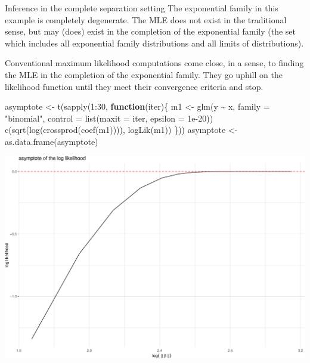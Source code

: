 \documentclass[
  ignorenonframetext,
]{beamer}
\newenvironment{Shaded}{\begin{snugshade}}{\end{snugshade}}
\newcommand{\AttributeTok}[1]{\textcolor[rgb]{0.77,0.63,0.00}{#1}}
\newcommand{\ControlFlowTok}[1]{\textcolor[rgb]{0.13,0.29,0.53}{\textbf{#1}}}
\newcommand{\DecValTok}[1]{\textcolor[rgb]{0.00,0.00,0.81}{#1}}
\newcommand{\FloatTok}[1]{\textcolor[rgb]{0.00,0.00,0.81}{#1}}
\newcommand{\FunctionTok}[1]{\textcolor[rgb]{0.00,0.00,0.00}{#1}}
\newcommand{\NormalTok}[1]{#1}
\newcommand{\OtherTok}[1]{\textcolor[rgb]{0.56,0.35,0.01}{#1}}
\newcommand{\SpecialCharTok}[1]{\textcolor[rgb]{0.00,0.00,0.00}{#1}}
\newcommand{\StringTok}[1]{\textcolor[rgb]{0.31,0.60,0.02}{#1}}
\begin{document}
\begin{frame}[fragile]{Inference in the complete separation setting}
\protect\hypertarget{inference-in-the-complete-separation-setting}{}
The exponential family in this example is completely degenerate. The MLE
does not exist in the traditional sense, but may (does) exist in the
completion of the exponential family (the set which includes all
exponential family distributions and all limits of distributions).

\vspace{12pt}

Conventional maximum likelihood computations come close, in a sense, to
finding the MLE in the completion of the exponential family. They go
uphill on the likelihood function until they meet their convergence
criteria and stop.

\vspace{12pt}
\tiny

\begin{Shaded}
\begin{Highlighting}[]
\NormalTok{asymptote }\OtherTok{\textless{}{-}} \FunctionTok{t}\NormalTok{(}\FunctionTok{sapply}\NormalTok{(}\DecValTok{1}\SpecialCharTok{:}\DecValTok{30}\NormalTok{, }\ControlFlowTok{function}\NormalTok{(iter)\{}
\NormalTok{  m1 }\OtherTok{\textless{}{-}} \FunctionTok{glm}\NormalTok{(y }\SpecialCharTok{\textasciitilde{}}\NormalTok{ x, }\AttributeTok{family =} \StringTok{"binomial"}\NormalTok{, }\AttributeTok{control =} \FunctionTok{list}\NormalTok{(}\AttributeTok{maxit =}\NormalTok{ iter, }\AttributeTok{epsilon =} \FloatTok{1e{-}20}\NormalTok{))}
  \FunctionTok{c}\NormalTok{(}\FunctionTok{sqrt}\NormalTok{(}\FunctionTok{log}\NormalTok{(}\FunctionTok{crossprod}\NormalTok{(}\FunctionTok{coef}\NormalTok{(m1)))), }\FunctionTok{logLik}\NormalTok{(m1))}
\NormalTok{\}))}
\NormalTok{asymptote }\OtherTok{\textless{}{-}} \FunctionTok{as.data.frame}\NormalTok{(asymptote)}
\end{Highlighting}
\end{Shaded}
\end{frame}

\begin{frame}{}
\protect\hypertarget{section-10}{}
\includegraphics{week7_p2_files/figure-beamer/unnamed-chunk-9-1.pdf}
\end{frame}
\end{document}
